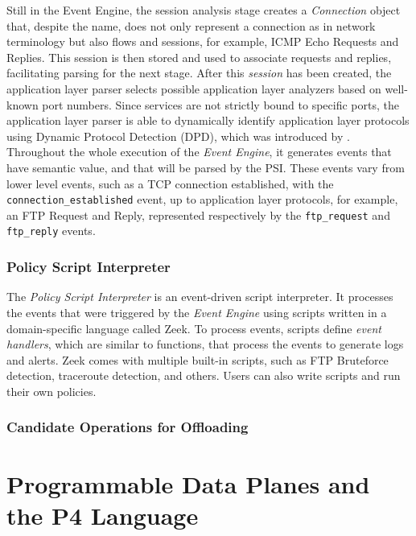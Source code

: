 Still in the Event Engine, the session analysis stage creates a \textit{Connection} object that, despite the name, does not only represent a connection as in network terminology but also flows and sessions, for example, ICMP Echo Requests and Replies. This session is then stored and used to associate requests and replies, facilitating parsing for the next stage. After this \textit{session} has been created, the application layer parser selects possible application layer analyzers based on well-known port numbers. Since services are not strictly bound to specific ports, the application layer parser is able to dynamically identify application layer protocols using Dynamic Protocol Detection (DPD), which was introduced by . Throughout the whole execution of the \textit{Event Engine}, it generates events that have semantic value, and that will be parsed by the PSI. These events vary from lower level events, such as a TCP connection established, with the \texttt{connection\_established} event, up to application layer protocols, for example, an FTP Request and Reply, represented respectively by the \texttt{ftp\_request} and  \texttt{ftp\_reply} events.


\subsubsection*{Policy Script Interpreter}
\label{sec:bg:zeek_psi}

The \textit{Policy Script Interpreter} is an event-driven script interpreter. It processes the events that were triggered by the \textit{Event Engine} using scripts written in a domain-specific language called Zeek. To process events, scripts define \textit{event handlers}, which are similar to functions, that process the events to generate logs and alerts. Zeek comes with multiple built-in scripts, such as FTP Bruteforce detection, traceroute detection, and others. Users can also write scripts and run their own policies.


\subsubsection*{Candidate Operations for Offloading}
\label{sec:bg:zeek_candidate_operations}



\section{Programmable Data Planes and the P4 Language}
\label{sec:bg:pdp}

